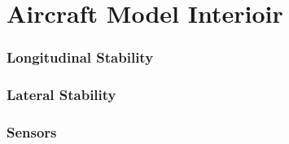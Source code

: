 \section{Aircraft Model Interioir}




\subsubsection{Longitudinal Stability}
\subsubsection{Lateral Stability}




\subsubsection{Sensors}

